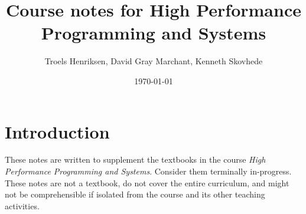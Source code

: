 \documentclass[oneside]{memoir}
\title{Course notes for High Performance Programming and Systems}
\author{Troels Henriksen, David Gray Marchant, Kenneth Skovhede} \date{\today}
\begin{document}
\maketitle

\section{Introduction}

These notes are written to supplement the textbooks in the course
\textit{High Performance Programming and Systems}.  Consider them
terminally in-progress.  These notes are not a textbook, do not cover
the entire curriculum, and might not be comprehensible if isolated
from the course and its other teaching activities.

\newpage
\tableofcontents



















\newpage



\end{document}
